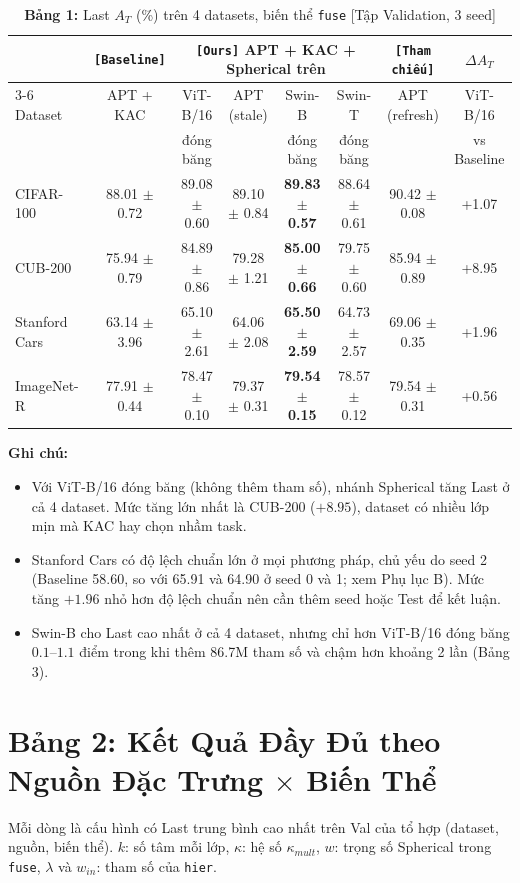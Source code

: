 \documentclass[10pt,a4paper]{article}
\newcommand{\src}[1]{\texttt{[#1]}}
\begin{document}
\begin{table}[h]
\centering\small
\caption{\textbf{Bảng 1:} Last $A_T$ (\%) trên 4 datasets, biến thể \texttt{fuse} [Tập Validation, 3 seed]}
\setlength{\tabcolsep}{3pt}
\begin{tabular}{lccccccc}
\toprule
 & \src{Baseline} & \multicolumn{4}{c}{\src{Ours} APT + KAC + Spherical trên} & \src{Tham chiếu} & $\Delta A_T$ \\
\cmidrule(lr){3-6}
Dataset & APT + KAC & ViT-B/16 & APT (stale) & Swin-B & Swin-T & APT (refresh) & ViT-B/16 \\
 &  & đóng băng &  & đóng băng & đóng băng &  & vs Baseline \\
\midrule
CIFAR-100 & 88.01 $\pm$ 0.72 & 89.08 $\pm$ 0.60 & 89.10 $\pm$ 0.84 & \textbf{89.83 $\pm$ 0.57} & 88.64 $\pm$ 0.61 & 90.42 $\pm$ 0.08 & +1.07 \\
CUB-200 & 75.94 $\pm$ 0.79 & 84.89 $\pm$ 0.86 & 79.28 $\pm$ 1.21 & \textbf{85.00 $\pm$ 0.66} & 79.75 $\pm$ 0.60 & 85.94 $\pm$ 0.89 & +8.95 \\
Stanford Cars & 63.14 $\pm$ 3.96 & 65.10 $\pm$ 2.61 & 64.06 $\pm$ 2.08 & \textbf{65.50 $\pm$ 2.59} & 64.73 $\pm$ 2.57 & 69.06 $\pm$ 0.35 & +1.96 \\
ImageNet-R & 77.91 $\pm$ 0.44 & 78.47 $\pm$ 0.10 & 79.37 $\pm$ 0.31 & \textbf{79.54 $\pm$ 0.15} & 78.57 $\pm$ 0.12 & 79.54 $\pm$ 0.31 & +0.56 \\
\bottomrule
\end{tabular}
\end{table}

\textbf{Ghi chú:}
\begin{itemize}
  \item Với ViT-B/16 đóng băng (không thêm tham số), nhánh Spherical tăng Last ở cả 4 dataset. Mức tăng lớn nhất là CUB-200 ($+8.95$), dataset có nhiều lớp mịn mà KAC hay chọn nhầm task.
  \item Stanford Cars có độ lệch chuẩn lớn ở mọi phương pháp, chủ yếu do seed 2 (Baseline 58.60, so với 65.91 và 64.90 ở seed 0 và 1; xem Phụ lục B). Mức tăng $+1.96$ nhỏ hơn độ lệch chuẩn nên cần thêm seed hoặc Test để kết luận.
  \item Swin-B cho Last cao nhất ở cả 4 dataset, nhưng chỉ hơn ViT-B/16 đóng băng $0.1$--$1.1$ điểm trong khi thêm 86.7M tham số và chậm hơn khoảng 2 lần (Bảng 3).
\end{itemize}

\section{Bảng 2: Kết Quả Đầy Đủ theo Nguồn Đặc Trưng $\times$ Biến Thể}
Mỗi dòng là cấu hình có Last trung bình cao nhất trên Val của tổ hợp (dataset, nguồn, biến thể). $k$: số tâm mỗi lớp, $\kappa$: hệ số $\kappa_{mult}$, $w$: trọng số Spherical trong \texttt{fuse}, $\lambda$ và $w_{in}$: tham số của \texttt{hier}.
\end{document}

